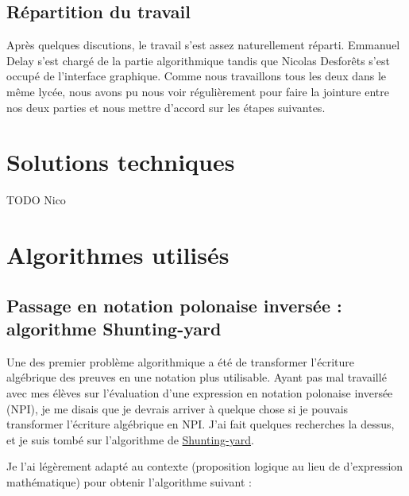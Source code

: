 \documentclass[12pt, algo]{cours}
\begin{document}
\subsection{Répartition du travail}

Après quelques discutions, le travail s'est assez naturellement réparti. Emmanuel Delay s'est chargé de la partie algorithmique tandis que Nicolas Desforêts s'est occupé de l'interface graphique. Comme nous travaillons tous les deux dans le même lycée, nous avons pu nous voir régulièrement pour faire la jointure entre nos deux parties et nous mettre d'accord sur les étapes suivantes.

\section{Solutions techniques}

TODO Nico

\section{Algorithmes utilisés}

\subsection{Passage en notation polonaise inversée : algorithme Shunting-yard}

Une des premier problème algorithmique a été de transformer l'écriture algébrique des preuves en une notation plus utilisable. Ayant pas mal travaillé avec mes élèves sur l'évaluation d'une expression en notation polonaise inversée (NPI), je me disais que je devrais arriver à quelque chose si je pouvais transformer l'écriture algébrique en NPI. J'ai fait quelques recherches la dessus, et je suis tombé sur l'algorithme de \href{https://fr.wikipedia.org/wiki/Algorithme_Shunting-yard}{Shunting-yard}.

Je l'ai légèrement adapté au contexte (proposition logique au lieu de d'expression mathématique) pour obtenir l'algorithme suivant :

\medskip
\end{document}
